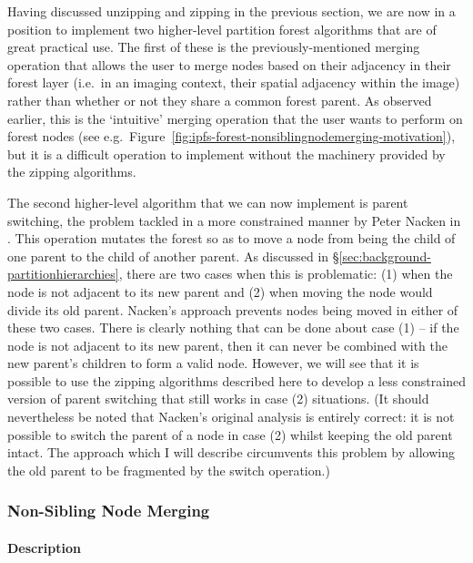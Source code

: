 Having discussed unzipping and zipping in the previous section, we are now in a position to implement two higher-level partition forest algorithms that are of great practical use. The first of these is the previously-mentioned merging operation that allows the user to merge nodes based on their adjacency in their forest layer (i.e.~in an imaging context, their spatial adjacency within the image) rather than whether or not they share a common forest parent. As observed earlier, this is the `intuitive' merging operation that the user wants to perform on forest nodes (see e.g.~Figure~\ref{fig:ipfs-forest-nonsiblingnodemerging-motivation}), but it is a difficult operation to implement without the machinery provided by the zipping algorithms.

The second higher-level algorithm that we can now implement is parent switching, the problem tackled in a more constrained manner by Peter Nacken in \cite{nacken95}. This operation mutates the forest so as to move a node from being the child of one parent to the child of another parent. As discussed in \S\ref{sec:background-partitionhierarchies}, there are two cases when this is problematic: (1) when the node is not adjacent to its new parent and (2) when moving the node would divide its old parent. Nacken's approach prevents nodes being moved in either of these two cases. There is clearly nothing that can be done about case (1) -- if the node is not adjacent to its new parent, then it can never be combined with the new parent's children to form a valid node. However, we will see that it is possible to use the zipping algorithms described here to develop a less constrained version of parent switching that still works in case (2) situations. (It should nevertheless be noted that Nacken's original analysis is entirely correct: it is not possible to switch the parent of a node in case (2) whilst keeping the old parent intact. The approach which I will describe circumvents this problem by allowing the old parent to be fragmented by the switch operation.)

\newpage

\subsubsection{Non-Sibling Node Merging}

\paragraph{Description}

